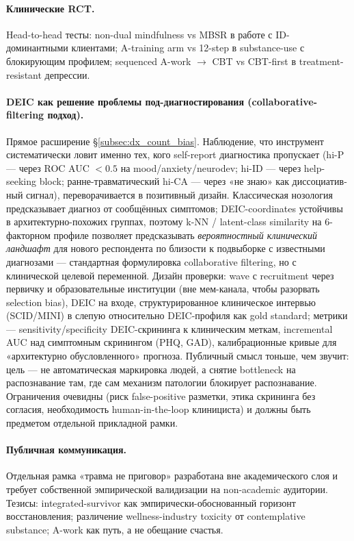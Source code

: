 \paragraph{Клинические RCT.} Head-to-head тесты: non-dual mindfulness vs MBSR в работе с ID-доминантными клиентами; A-training arm vs 12-step в substance-use с блокирующим профилем; sequenced A-work $\to$ CBT vs CBT-first в treatment-resistant депрессии.

\paragraph{DEIC как решение проблемы под-диагностирования (collaborative-filtering подход).} Прямое расширение §\ref{subsec:dx_count_bias}. Наблюдение, что инструмент систематически ловит именно тех, кого self-report диагностика пропускает (hi-P --- через ROC AUC $< 0.5$ на mood/anxiety/neurodev; hi-ID --- через help-seeking block; ранне-травматический hi-CA --- через «не знаю» как дис­со­циа­тив­ный сигнал), переворачивается в позитивный дизайн. Классическая нозология предсказывает диагноз от сообщённых симптомов; DEIC-coordinates устойчивы в архитектурно-похожих группах, поэтому k-NN / latent-class similarity на 6-факторном профиле позволяет предсказывать \emph{вероятностный клинический ландшафт} для нового респондента по близости к подвыборке с известными диагнозами --- стандартная формулировка collaborative filtering, но с клинической целевой переменной. Дизайн проверки: wave с recruitment через первичку и образовательные институции (вне мем-канала, чтобы разорвать selection bias), DEIC на входе, структурированное клиническое интервью (SCID/MINI) в слепую относительно DEIC-профиля как gold standard; метрики --- sensitivity/specificity DEIC-скрининга к клиническим меткам, incremental AUC над симптомным скринингом (PHQ, GAD), калибрационные кривые для «архитектурно обусловленного» прогноза. Публичный смысл тоньше, чем звучит: цель --- не автоматическая маркировка людей, а снятие bottleneck на распознавание там, где сам механизм патологии блокирует распознавание. Ограничения очевидны (риск false-positive разметки, этика скрининга без согласия, необходимость human-in-the-loop клинициста) и должны быть предметом отдельной прикладной рамки.

\paragraph{Публичная коммуникация.} Отдельная рамка «травма не приговор» разработана вне академического слоя и требует собственной эмпирической валидизации на non-academic аудитории. Тезисы: integrated-survivor как эмпирически-обоснованный горизонт восстановления; различение wellness-industry toxicity от contemplative substance; A-work как путь, а не обещание счастья.

